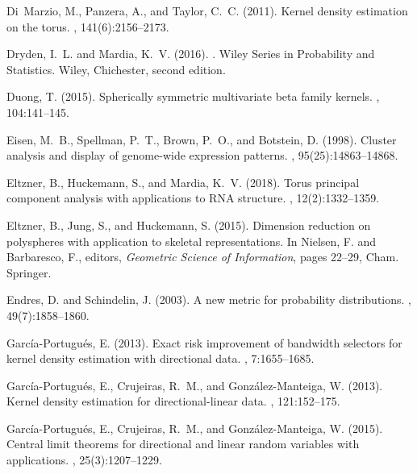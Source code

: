 \documentclass[oneside,11pt]{article}
\begin{document}
\begin{thebibliography}{}
	Di~Marzio, M., Panzera, A., and Taylor, C.~C. (2011).
	\newblock Kernel density estimation on the torus.
	, 141(6):2156--2173.

	Dryden, I.~L. and Mardia, K.~V. (2016).
	.
	\newblock Wiley Series in Probability and Statistics. Wiley, Chichester, second
	edition.

	Duong, T. (2015).
	\newblock Spherically symmetric multivariate beta family kernels.
	, 104:141--145.

	Eisen, M.~B., Spellman, P.~T., Brown, P.~O., and Botstein, D. (1998).
	\newblock Cluster analysis and display of genome-wide expression patterns.
	, 95(25):14863--14868.

	Eltzner, B., Huckemann, S., and Mardia, K.~V. (2018).
	\newblock Torus principal component analysis with applications to {RNA}
	structure.
	, 12(2):1332--1359.

	Eltzner, B., Jung, S., and Huckemann, S. (2015).
	\newblock Dimension reduction on polyspheres with application to skeletal
	representations.
	\newblock In Nielsen, F. and Barbaresco, F., editors, {\em Geometric Science of
		Information}, pages 22--29, Cham. Springer.

	Endres, D. and Schindelin, J. (2003).
	\newblock A new metric for probability distributions.
	, 49(7):1858--1860.

	Garc\'ia-Portugu\'es, E. (2013).
	\newblock Exact risk improvement of bandwidth selectors for kernel density
	estimation with directional data.
	, 7:1655--1685.

	Garc\'ia-Portugu\'es, E., Crujeiras, R.~M., and Gonz\'alez-Manteiga, W. (2013).
	\newblock Kernel density estimation for directional-linear data.
	, 121:152--175.

	Garc\'ia-Portugu\'es, E., Crujeiras, R.~M., and Gonz\'alez-Manteiga, W. (2015).
	\newblock Central limit theorems for directional and linear random variables
	with applications.
	, 25(3):1207--1229.


\end{thebibliography}
\end{document}
